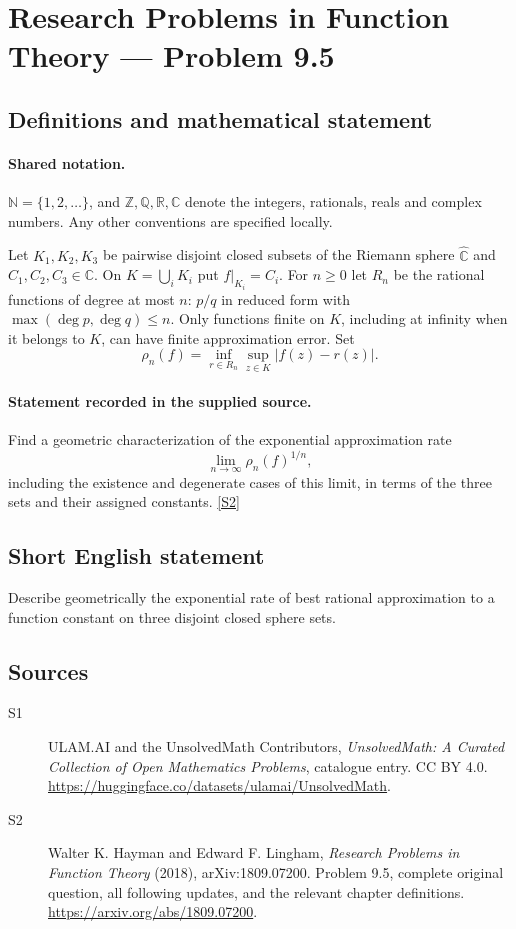 \documentclass[11pt]{book}
\newcommand{\sref}[2]{\hyperlink{source:#1:#2}{[S#2]}}
\begin{document}
\section{Research Problems in Function Theory — Problem 9.5}\label{statement}

\subsection{Definitions and mathematical statement}

\paragraph{Shared notation.}$\mathbb N=\{1,2,\ldots\}$, and $\mathbb Z,\mathbb Q,\mathbb R,\mathbb C$ denote the integers, rationals, reals and complex numbers. Any other conventions are specified locally.


Let $K_1,K_2,K_3$ be pairwise disjoint closed subsets of the Riemann sphere $\widehat{\mathbb C}$ and $C_1,C_2,C_3\in\mathbb C$. On $K=\bigcup_iK_i$ put $f|_{K_i}=C_i$. For $n\ge0$ let $R_n$ be the rational functions of degree at most $n$: $p/q$ in reduced form with $\max(\deg p,\deg q)\le n$. Only functions finite on $K$, including at infinity when it belongs to $K$, can have finite approximation error. Set \[\rho_n(f)=\inf_{r\in R_n}\sup_{z\in K}|f(z)-r(z)|.\]
\paragraph{Statement recorded in the supplied source.}
Find a geometric characterization of the exponential approximation rate \[\lim_{n\to\infty}\rho_n(f)^{1/n},\] including the existence and degenerate cases of this limit, in terms of the three sets and their assigned constants. \sref{statement}{2}
\subsection{Short English statement}
Describe geometrically the exponential rate of best rational approximation to a function constant on three disjoint closed sphere sets.
\subsection{Sources}
\begin{description}
\item[\hypertarget{source:statement:1}{S1}] ULAM.AI and the UnsolvedMath Contributors, \emph{UnsolvedMath: A Curated Collection of Open Mathematics Problems}, catalogue entry. CC BY 4.0. \url{https://huggingface.co/datasets/ulamai/UnsolvedMath}.
\item[\hypertarget{source:statement:2}{S2}] Walter K. Hayman and Edward F. Lingham, \emph{Research Problems in Function Theory} (2018), arXiv:1809.07200. Problem 9.5, complete original question, all following updates, and the relevant chapter definitions. \url{https://arxiv.org/abs/1809.07200}.
\end{description}
\label{end:statement}
\end{document}

